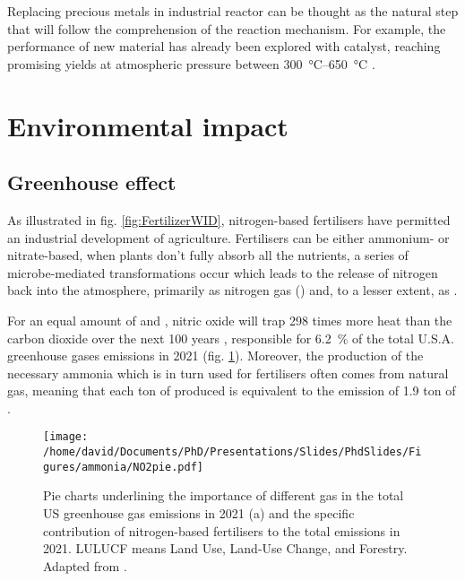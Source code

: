 Replacing precious metals in industrial reactor can be thought as the natural step that will follow the comprehension of the reaction mechanism.
For example, the performance of new material has already been explored with  catalyst, reaching promising  yields at atmospheric pressure between \qtyrange{300}{650}{\degreeCelsius} \parencite{Ruan2022}.


\section{Environmental impact}

\subsection{Greenhouse effect}

As illustrated in fig. \ref{fig:FertilizerWID}, nitrogen-based fertilisers have permitted an industrial development of agriculture.
Fertilisers can be either ammonium- or nitrate-based, when plants don't fully absorb all the nutrients, a series of microbe-mediated transformations occur which leads to the release of nitrogen back into the atmosphere, primarily as nitrogen gas () and, to a lesser extent, as .

For an equal amount of  and , nitric oxide will trap 298 times more heat than the carbon dioxide over the next 100 years \parencite{MITCLIMATE}, responsible for \qty{6.2}{\percent} of the total U.S.A. greenhouse gases emissions in 2021 (fig. \ref{fig:PieGreenhouseNO2}).
Moreover, the production of the necessary ammonia which is in turn used for fertilisers often comes from natural gas, meaning that each ton of  produced is equivalent to the emission of 1.9 ton of  \parencite{Rafiqul2005, Chen2018}.

\begin{figure}[!htb]
    \centering
    \texttt{[image: /home/david/Documents/PhD/Presentations/Slides/PhdSlides/Figures/ammonia/NO2pie.pdf]}
    \caption{
    Pie charts underlining the importance of different gas in the total US greenhouse gas emissions in 2021 (a) and the specific contribution of nitrogen-based fertilisers to the total  emissions in 2021.
    LULUCF means Land Use, Land-Use Change, and Forestry.
    Adapted from \cite{EPAGreenhouseGases}.
    }
    \label{fig:PieGreenhouseNO2}
\end{figure}

